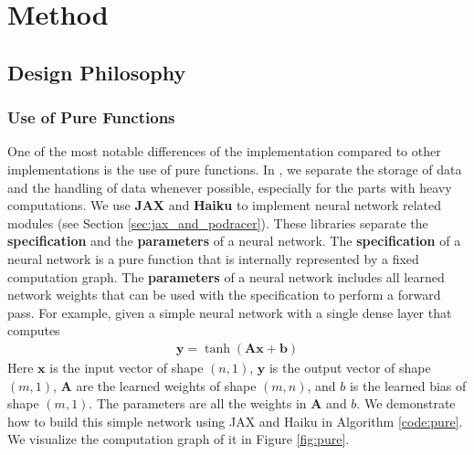 \chapter{Method} \label{sec:method}
\section{Design Philosophy}
\subsection{Use of Pure Functions}
One of the most notable differences of the \moozi implementation compared to other implementations is the use of pure functions.
In \moozi, we separate the storage of data and the handling of data whenever possible, especially for the parts with heavy computations.
We use \textbf{JAX} and \textbf{Haiku} \cite{HaikuSonnetJAX_Hennigan.Cai.ea_2020,JAXComposableTransformations_JamesBradbury.RoyFrostig.ea_2018} to implement neural network related modules (see Section \ref{sec:jax_and_podracer}).
These libraries separate the \textbf{specification} and the \textbf{parameters} of a neural network.
The \textbf{specification} of a neural network is a pure function that is internally represented by a fixed computation graph.
The \textbf{parameters} of a neural network includes all learned network weights that can be used with the specification to perform a forward pass.
For example, given a simple neural network with a single dense layer that computes
\begin{align*}
    \mathbf{y} = \operatorname{tanh}\left( \mathbf{A}\mathbf{x} + \mathbf{b} \right)
\end{align*}
Here $\mathbf{x}$ is the input vector of shape $(n, 1)$, $\mathbf{y}$ is the output vector of shape $(m, 1)$, $\mathbf{A}$ are the learned weights of shape $(m, n)$, and $b$ is the learned bias of shape $(m, 1)$.
The parameters are all the weights in $\mathbf{A}$ and $b$.
We demonstrate how to build this simple network using JAX and Haiku in Algorithm \ref{code:pure}.
We visualize the computation graph of it in Figure \ref{fig:pure}.
